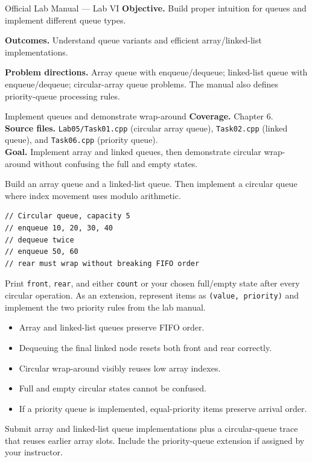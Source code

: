 
\begin{sourcealignment}{Official Lab Manual --- Lab VI}
\textbf{Objective.} Build proper intuition for queues and implement different queue types.

\textbf{Outcomes.} Understand queue variants and efficient array/linked-list implementations.

\textbf{Problem directions.} Array queue with enqueue/dequeue; linked-list queue with enqueue/dequeue; circular-array queue problems. The manual also defines priority-queue processing rules.
\end{sourcealignment}

\begin{labproject}{Implement queues and demonstrate wrap-around}
\textbf{Coverage.} Chapter 6.\\
\textbf{Source files.} \texttt{Lab05/Task01.cpp} (circular array queue), \texttt{Task02.cpp} (linked queue), and \texttt{Task06.cpp} (priority queue).\\
\textbf{Goal.} Implement array and linked queues, then demonstrate circular wrap-around without confusing the full and empty states.

Build an array queue and a linked-list queue. Then implement a circular queue where index movement uses modulo arithmetic.

\begin{lstlisting}
// Circular queue, capacity 5
// enqueue 10, 20, 30, 40
// dequeue twice
// enqueue 50, 60
// rear must wrap without breaking FIFO order
\end{lstlisting}

\begin{tryit}
Print \texttt{front}, \texttt{rear}, and either \texttt{count} or your chosen full/empty state after every circular operation. As an extension, represent items as \texttt{(value, priority)} and implement the two priority rules from the lab manual.
\end{tryit}
\end{labproject}

\begin{verification}
\begin{itemize}
  \item Array and linked-list queues preserve FIFO order.
  \item Dequeuing the final linked node resets both front and rear correctly.
  \item Circular wrap-around visibly reuses low array indexes.
  \item Full and empty circular states cannot be confused.
  \item If a priority queue is implemented, equal-priority items preserve arrival order.
\end{itemize}
\end{verification}

\begin{labdeliverable}
Submit array and linked-list queue implementations plus a circular-queue trace that reuses earlier array slots. Include the priority-queue extension if assigned by your instructor.
\end{labdeliverable}
